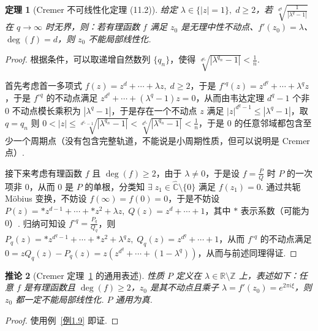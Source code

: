 \documentclass[11pt, a4paper, oneside]{ctexart}
\newtheorem{theorem}{定理}[section]
\newtheorem{corollary}[theorem]{推论}
\newcommand{\C}{\mathbb{C}}
\newcommand{\R}{\mathbb{R}}
\newcommand{\Z}{\mathbb{Z}}
\newcommand{\abs}[1]{\left|{#1}\right|}
\begin{document}
    \begin{theorem}[Cremer 不可线性化定理 (11.2)]\label{定理11.2}
        给定 $\lambda\in\{|z|=1\},\;d\geq 2$，若 $\sqrt[d^q]{\frac{1}{|\lambda^q-1|}}$ 在 $q\to\infty$ 时无界，则：若有理函数 $f$ 满足 $z_0$ 是无理中性不动点、$f'(z_0)=\lambda$、$\deg(f)=d$，则 $z_0$ 不能局部线性化.
    \end{theorem}
    \begin{proof}
        根据条件，可以取递增自然数列 $\{q_n\}$，使得 $\sqrt[d^{q_n}]{|\lambda^{q_n}-1|}<\frac{1}{n}$.

        首先考虑首一多项式 $f(z)=z^d+\cdots+\lambda z,\; d\geq 2$，于是 $f^{\circ q}(z)=z^{d^q}+\cdots+\lambda^q z$，于是 $f^{\circ q}$ 的不动点满足 $z^{d^q}+\cdots+(\lambda^q-1)z=0$，从而由韦达定理 $d^q-1$ 个非 $0$ 不动点模长乘积为 $\abs{\lambda^q-1}$，于是存在一个不动点 $z$ 满足 $\abs{z}^{d^q-1}\leq \abs{\lambda^q-1}$，取 $q=q_n$ 则 $0<\abs{z}\leq \sqrt[d^{q_n}-1]{\abs{\lambda^{q_n}-1}}<\sqrt[d^{q_n}]{|\lambda^{q_n}-1|}<\frac{1}{n}$，于是 $0$ 的任意邻域都包含至少一个周期点（没有包含完整轨道，不能说是小周期性质，但可以说明是 Cremer 点）.

        接下来考虑有理函数 $f$ 且 $\deg(f)\geq 2$，由于 $\lambda\neq 0$，于是设 $f=\frac{P}{Q}$ 时 $P$ 的一次项非 $0$，从而 $0$ 是 $P$ 的单根，分类知 $\exists\; z_1\in \hat{\C}\setminus\{0\}$ 满足 $f(z_1)=0$. 通过共轭 Möbius 变换，不妨设 $f(\infty)=f(0)=0$，于是不妨设 $P(z)=\ast z^{d-1}+\cdots+\ast z^2+\lambda z,\; Q(z)=z^d+\cdots+1$，其中 $\ast$ 表示系数（可能为 $0$）. 归纳可知设 $f^{\circ q}=\frac{P_q}{Q_q}$，则 $P_q(z)=\ast z^{d^q-1}+\cdots+\ast z^2+\lambda^q z,\; Q_q(z)=z^{d^q}+\cdots+1$，从而 $f^{\circ q}$ 的不动点满足 $0=zQ_q(z)-P_q(z)=z(z^{d^q}+\cdots+(1-\lambda^q))$，从而与前述同理得证.
    \end{proof}
    \begin{corollary}[Cremer 定理~\ref{定理11.2} 的通用表述]
        性质 $P$ 定义在 $\lambda\in\R\setminus\Z$ 上，表述如下：任意 $f$ 是有理函数且 $\deg(f)\geq 2$，$z_0$ 是其不动点且乘子 $\lambda=f'(z_0)=e^{2\pi i\xi}$，则 $z_0$ 都一定不能局部线性化. $P$ 通用为真.
    \end{corollary}
    \begin{proof}
        使用例~\ref{例1.9} 即证.
    \end{proof}
\end{document}

